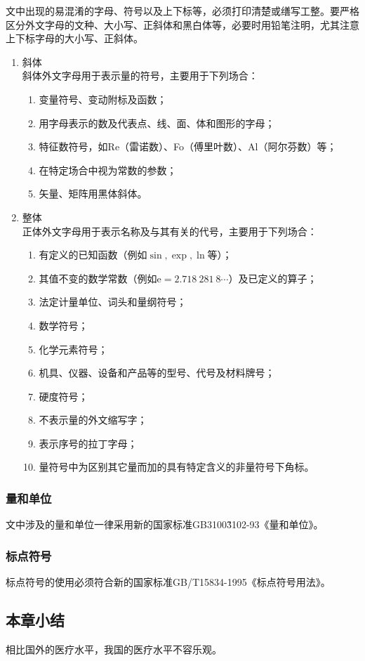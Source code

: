 文中出现的易混淆的字母、符号以及上下标等，必须打印清楚或缮写工整。要严格区分外文字母的文种、大小写、正斜体和黑白体等，必要时用铅笔注明，尤其注意上下标字母的大小写、正斜体。
\begin{enumerate}[label=(\arabic*)]
  \item{斜体\\
  斜体外文字母用于表示量的符号，主要用于下列场合：
  }
  \begin{enumerate}[label=\roman*]
    \item{变量符号、变动附标及函数；}
    \item{用字母表示的数及代表点、线、面、体和图形的字母；}
    \item{特征数符号，如Re（雷诺数）、Fo（傅里叶数）、Al（阿尔芬数）等；}
    \item{在特定场合中视为常数的参数；}
    \item{矢量、矩阵用黑体斜体。}
  \end{enumerate}
  \item{整体\\
  正体外文字母用于表示名称及与其有关的代号，主要用于下列场合：
  }
  \begin{enumerate}[label=\roman*]
    \item{有定义的已知函数（例如$\sin, \exp, \ln$等）；}
    \item{其值不变的数学常数（例如$\mathrm{e}=2.718~281~8\cdots$）及已定义的算子；}
    \item{法定计量单位、词头和量纲符号；}
    \item{数学符号；}
    \item{化学元素符号；}
    \item{机具、仪器、设备和产品等的型号、代号及材料牌号；}
    \item{硬度符号；}
    \item{不表示量的外文缩写字；}
    \item{表示序号的拉丁字母；}
    \item{量符号中为区别其它量而加的具有特定含义的非量符号下角标。}
  \end{enumerate}
\end{enumerate}

\subsubsection{量和单位}

文中涉及的量和单位一律采用新的国家标准GB3100\~ 3102-93《量和单位》。

\subsubsection{标点符号}

标点符号的使用必须符合新的国家标准GB/T15834-1995《标点符号用法》。

\subsection{本章小结}

相比国外的医疗水平，我国的医疗水平不容乐观。

